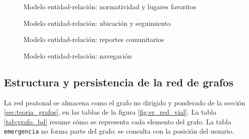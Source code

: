 \begin{figure}
    \centering
    
    \caption{Modelo entidad-relación: normatividad y lugares favoritos}
    \label{fig:er_normatividad}
\end{figure}

\begin{figure}
    \centering
    
    \caption{Modelo entidad-relación: ubicación y seguimiento}
    \label{fig:er_seguimiento}
\end{figure}

\begin{figure}
    \centering
    
    \caption{Modelo entidad-relación: reportes comunitarios}
    \label{fig:er_reportes}
\end{figure}

\begin{figure}
    \centering
    
    \caption{Modelo entidad-relación: navegación}
    \label{fig:er_navegacion}
\end{figure}



\subsection{Estructura y persistencia de la red de grafos}

La red peatonal se almacena como el grafo no dirigido y ponderado de la sección \ref{sec:teoria_grafos}, en las tablas de la figura \ref{fig:er_red_vial}. La tabla \ref{tab:grafo_bd} resume cómo se representa cada elemento del grafo. La tabla \texttt{emergencia} no forma parte del grafo: se consulta con la posición del usuario.

